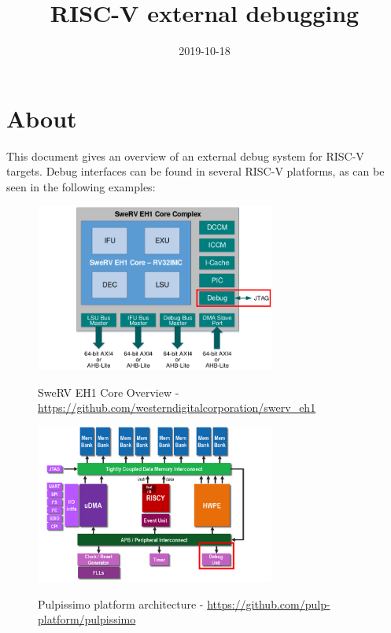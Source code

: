 \documentclass{article}
\title{RISC-V external debugging}
\date{2019-10-18}
\begin{document}
	\maketitle
	
	\section{About}
	
	This document gives an overview of an external debug system for RISC-V targets. Debug interfaces can be found in several RISC-V platforms, as can be seen in the following examples:
	
	\begin{figure}[H]
   	\centering
   	\includegraphics[width=0.7\textwidth]{swerv.png}
   	
   	SweRV EH1 Core Overview - \url{https://github.com/westerndigitalcorporation/swerv_eh1}
	\end{figure}
	
	\begin{figure}[H]
   	\centering
   	\includegraphics[width=0.7\textwidth]{pulpissimo_archi.png}
   	
   	Pulpissimo platform architecture - \url{https://github.com/pulp-platform/pulpissimo}
	\end{figure}
	
\end{document}
